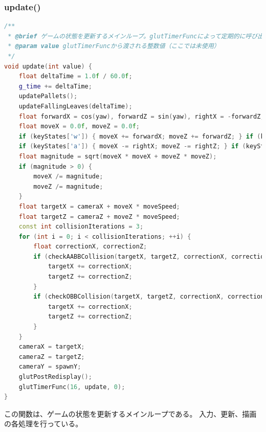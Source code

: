 \documentclass[uplatex,dvipdfmx,a4paper]{jsarticle}
\begin{document}
\hypertarget{func:update}{}\subsubsection{update()}\label{func:update}
\begin{lstlisting}[language=C++, caption={update() 関数}, label={lst:update_detail}]
/**
 * @brief ゲームの状態を更新するメインループ。glutTimerFuncによって定期的に呼び出される。
 * @param value glutTimerFuncから渡される整数値（ここでは未使用）
 */
void update(int value) {
    float deltaTime = 1.0f / 60.0f;
    g_time += deltaTime;
    updatePallets();
    updateFallingLeaves(deltaTime);
    float forwardX = cos(yaw), forwardZ = sin(yaw), rightX = -forwardZ, rightZ = forwardX;
    float moveX = 0.0f, moveZ = 0.0f;
    if (keyStates['w']) { moveX += forwardX; moveZ += forwardZ; } if (keyStates['s']) { moveX -= forwardX; moveZ -= forwardZ; }
    if (keyStates['a']) { moveX -= rightX; moveZ -= rightZ; } if (keyStates['d']) { moveX += rightX; moveZ += rightZ; }
    float magnitude = sqrt(moveX * moveX + moveZ * moveZ);
    if (magnitude > 0) {
        moveX /= magnitude;
        moveZ /= magnitude;
    }
    float targetX = cameraX + moveX * moveSpeed;
    float targetZ = cameraZ + moveZ * moveSpeed;
    const int collisionIterations = 3; 
    for (int i = 0; i < collisionIterations; ++i) {
        float correctionX, correctionZ;
        if (checkAABBCollision(targetX, targetZ, correctionX, correctionZ)) {
            targetX += correctionX;
            targetZ += correctionZ;
        }
        if (checkOBBCollision(targetX, targetZ, correctionX, correctionZ)) {
            targetX += correctionX;
            targetZ += correctionZ;
        }
    }
    cameraX = targetX;
    cameraZ = targetZ;
    cameraY = spawnY;
    glutPostRedisplay();
    glutTimerFunc(16, update, 0);
}
\end{lstlisting}
この関数は、ゲームの状態を更新するメインループである。
入力、更新、描画の各処理を行っている。
\end{document}
